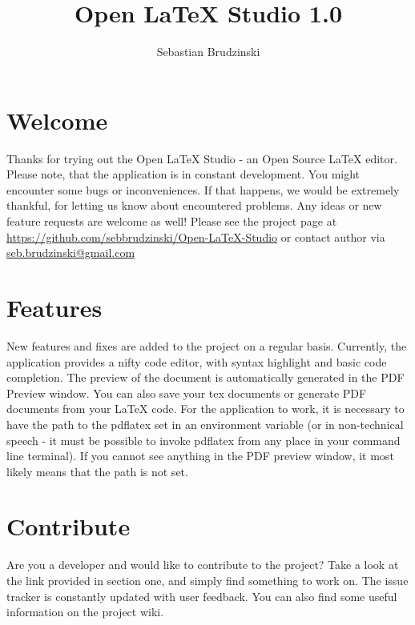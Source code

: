 \documentclass[12pt]{article}
\title{Open \LaTeX{} Studio 1.0}
\date{}
\author{Sebastian Brudzinski}
\begin{document}
  \maketitle
  \section{Welcome}
  Thanks for trying out the Open \LaTeX{} Studio - an Open Source \LaTeX{} editor. Please note, that the
  application is in constant development. You might encounter some bugs or inconveniences. If that happens, 
  we would be extremely thankful, for letting us know about encountered problems. Any ideas or new feature
  requests are welcome as well! Please see the project page at 
  \url{https://github.com/sebbrudzinski/Open-LaTeX-Studio}
  or contact author via
  \href{mailto:seb.brudzinski@gmail.com}{seb.brudzinski@gmail.com}

  \section{Features}
  New features and fixes are added to the project on a regular basis. Currently, the application provides
  a nifty code editor, with syntax highlight and basic code completion. The preview of the document is automatically
  generated in the PDF Preview window. You can also save your tex documents or generate PDF documents from your
  \LaTeX{} code. For the application to work, it is necessary to have the path to the pdflatex set in an 
  environment variable (or in non-technical speech - it must be possible to invoke pdflatex from any place
  in your command line terminal).
 If you cannot see anything in the PDF preview window, it most likely means that
  the path is not set.

  \section{Contribute}
  Are you a developer and would like to contribute to the project? Take a look at the link provided in section one, 
  and simply find something to work on. The issue tracker is constantly updated with user feedback. You can also
  find some useful information on the project wiki.
\end{document}
